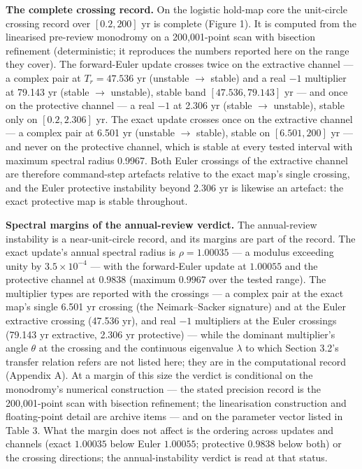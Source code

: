 \documentclass[11pt]{article}
\begin{document}
\textbf{The complete crossing record.} On the logistic
hold-map core the unit-circle crossing record over \([0.2, 200]\) yr is
complete (Figure 1). It is computed from the linearised pre-review
monodromy on a 200,001-point scan with bisection refinement (deterministic;
it reproduces the numbers reported here on the range they cover). The
forward-Euler update crosses twice on the extractive channel --- a
complex pair at \(T_r = 47.536\) yr (unstable \(\to\) stable) and a real
\(-1\) multiplier at 79.143 yr (stable \(\to\) unstable), stable band
\([47.536, 79.143]\) yr --- and once on the protective channel --- a real
\(-1\) at 2.306 yr (stable \(\to\) unstable), stable only on
\([0.2, 2.306]\) yr. The exact update crosses once on the
extractive channel --- a complex pair at 6.501 yr (unstable \(\to\)
stable), stable on \([6.501, 200]\) yr --- and never on the protective
channel, which is stable at every tested interval with maximum spectral
radius 0.9967. Both Euler crossings of the extractive channel are
therefore command-step artefacts relative to the exact map's single
crossing, and the Euler protective instability beyond 2.306 yr is
likewise an artefact: the exact protective map is stable throughout.

\textbf{Spectral margins of the annual-review verdict.} The
annual-review instability is a near-unit-circle record, and its margins
are part of the record. The exact update's annual
spectral radius is \(\rho = 1.00035\) --- a modulus exceeding unity by
\(3.5\times 10^{-4}\) --- with the forward-Euler update at \(1.00055\)
and the protective channel at \(0.9838\) (maximum \(0.9967\) over the
tested range). The multiplier types are reported with the crossings ---
a complex pair at the exact map's single 6.501 yr crossing (the
Neimark--Sacker signature) and at the Euler extractive crossing (47.536 yr), and real \(-1\) multipliers at the Euler
crossings (79.143 yr extractive, 2.306 yr protective) --- while the
dominant multiplier's angle \(\theta\) at the crossing and the
continuous eigenvalue \(\lambda\) to which Section 3.2's transfer
relation refers are not listed here; they are in the
computational record (Appendix A). At a margin of this size the
verdict is conditional on the monodromy's numerical construction --- the
stated precision record is the 200,001-point scan with bisection
refinement; the linearisation construction and floating-point detail are
archive items --- and on the parameter vector listed in Table 3. What
the margin does not affect is the ordering across updates and
channels (exact \(1.00035\) below Euler \(1.00055\); protective
\(0.9838\) below both) or the crossing directions; the annual-instability verdict is read at that status.
\end{document}
